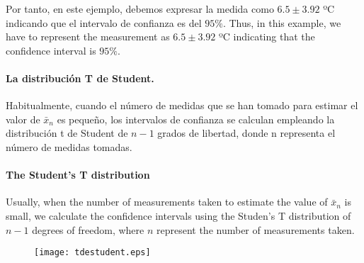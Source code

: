 \begin{paracol}{2}
Por tanto, en este ejemplo, debemos expresar la medida como $6.5 \pm 3.92$ ºC indicando que el intervalo de confianza es del $95\%$.
\switchcolumn
Thus, in this example, we have to represent the measurement as $6.5 \pm 3.92$ ºC indicating that the confidence interval is $95\%$.
\end{paracol}

\begin{paracol}{2}
\paragraph{La distribución T de Student.} 
Habitualmente, cuando el número de medidas que se han tomado para estimar el valor de $\bar{x}_n$ es pequeño, los intervalos de confianza se calculan empleando la distribución t de Student de $n-1$ grados de libertad, donde  n representa el número de medidas tomadas.

\switchcolumn
\paragraph{The Student's T distribution}
Usually, when the number of measurements taken to estimate the value of $\bar{x}_n$ is small, we calculate the confidence intervals using the Studen's T distribution of $n-1$ degrees of freedom, where $n$ represent the number of measurements taken.  
\end{paracol}

\begin{figure}[h]
\centering
\texttt{[image: tdestudent.eps]}
\label{fig:tdst}
\end{figure}


